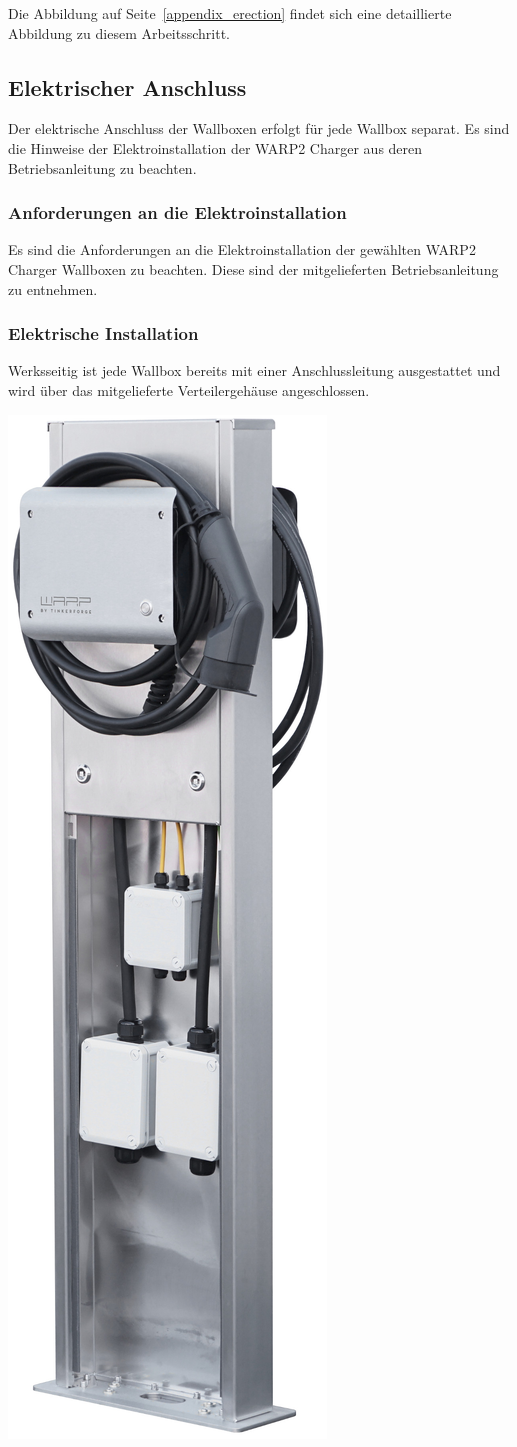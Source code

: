 \documentclass[a4paper,10pt]{article}
\begin{document}
\begin{multicols*}{2}
	Die Abbildung auf Seite~\ref{appendix_erection} findet sich eine
	detaillierte Abbildung zu diesem Arbeitsschritt.

	\subsection{Elektrischer Anschluss}
	Der elektrische Anschluss der Wallboxen erfolgt für jede Wallbox separat.
	Es sind die Hinweise der Elektroinstallation der WARP2 Charger aus deren
	Betriebsanleitung zu beachten.

	\subsubsection{Anforderungen an die Elektroinstallation}
	Es sind die Anforderungen an die Elektroinstallation der gewählten WARP2
	Charger Wallboxen zu beachten. Diese sind der mitgelieferten
	Betriebsanleitung zu entnehmen.

	\subsubsection{Elektrische Installation}
	Werksseitig ist jede Wallbox bereits mit einer Anschlussleitung
	ausgestattet und wird über das mitgelieferte Verteilergehäuse
	angeschlossen.

	\begin{center}
		\includegraphics[width=0.3\linewidth]{./img/warp-charger-stand-back-opened}
	\end{center}


\end{multicols*}
\end{document}
